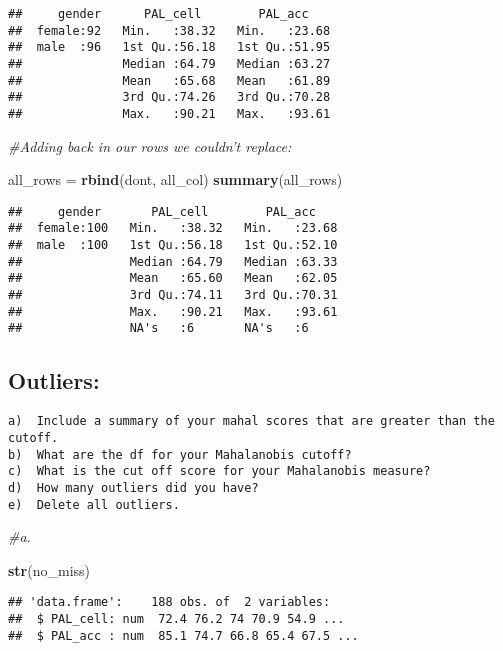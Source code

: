 \documentclass[
]{article}
\newenvironment{Shaded}{\begin{snugshade}}{\end{snugshade}}
\newcommand{\CommentTok}[1]{\textcolor[rgb]{0.56,0.35,0.01}{\textit{#1}}}
\newcommand{\KeywordTok}[1]{\textcolor[rgb]{0.13,0.29,0.53}{\textbf{#1}}}
\newcommand{\NormalTok}[1]{#1}
\newcommand{\StringTok}[1]{\textcolor[rgb]{0.31,0.60,0.02}{#1}}
\begin{document}
\begin{verbatim}
##     gender      PAL_cell        PAL_acc     
##  female:92   Min.   :38.32   Min.   :23.68  
##  male  :96   1st Qu.:56.18   1st Qu.:51.95  
##              Median :64.79   Median :63.27  
##              Mean   :65.68   Mean   :61.89  
##              3rd Qu.:74.26   3rd Qu.:70.28  
##              Max.   :90.21   Max.   :93.61
\end{verbatim}

\begin{Shaded}
\begin{Highlighting}[]
\CommentTok{#Adding back in our rows we couldn’t replace:}

\NormalTok{all_rows =}\StringTok{ }\KeywordTok{rbind}\NormalTok{(dont, all_col)}
\KeywordTok{summary}\NormalTok{(all_rows)}
\end{Highlighting}
\end{Shaded}

\begin{verbatim}
##     gender       PAL_cell        PAL_acc     
##  female:100   Min.   :38.32   Min.   :23.68  
##  male  :100   1st Qu.:56.18   1st Qu.:52.10  
##               Median :64.79   Median :63.33  
##               Mean   :65.60   Mean   :62.05  
##               3rd Qu.:74.11   3rd Qu.:70.31  
##               Max.   :90.21   Max.   :93.61  
##               NA's   :6       NA's   :6
\end{verbatim}

\hypertarget{outliers}{%
\subsection{Outliers:}\label{outliers}}

\begin{verbatim}
a)  Include a summary of your mahal scores that are greater than the cutoff.
b)  What are the df for your Mahalanobis cutoff?
c)  What is the cut off score for your Mahalanobis measure?
d)  How many outliers did you have?
e)  Delete all outliers. 
\end{verbatim}

\begin{Shaded}
\begin{Highlighting}[]
\CommentTok{#a.}

\KeywordTok{str}\NormalTok{(no_miss)}
\end{Highlighting}
\end{Shaded}

\begin{verbatim}
## 'data.frame':    188 obs. of  2 variables:
##  $ PAL_cell: num  72.4 76.2 74 70.9 54.9 ...
##  $ PAL_acc : num  85.1 74.7 66.8 65.4 67.5 ...
\end{verbatim}
\end{document}
